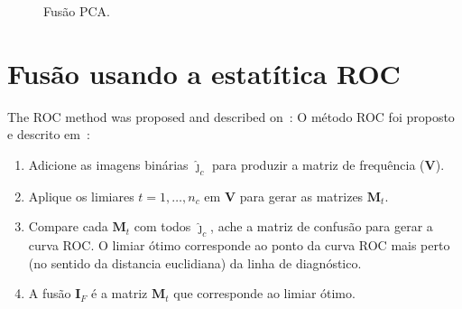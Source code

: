 	\begin{figure}[htb!]
	\caption{Fusão PCA.}
\label{fig:cap_fusao_pca}
\end{figure}

\section{Fusão usando a estatítica ROC}
The ROC method was proposed and described on~\cite{gs,fawcett}:
O método ROC foi proposto e descrito em~\cite{gs,fawcett}:
\begin{enumerate}
\item  Adicione as imagens binárias $\bm{\widehat\jmath}_c$ para produzir a matriz de frequência ($\bm V$). 
\item Aplique os limiares $t=1,\dots,n_c$ em $\bm V$ para gerar as matrizes $\bm M_t$.
\item Compare cada $\bm M_t$ com todos $\bm{\widehat\jmath}_c$, ache a matriz de confusão para gerar a curva ROC. O limiar ótimo corresponde ao ponto da curva ROC mais perto (no sentido da distancia euclidiana) da linha de diagnóstico.
\item A fusão $\bm I_F$ é a matriz $\bm M_t$ que corresponde ao limiar ótimo.
\end{enumerate}


